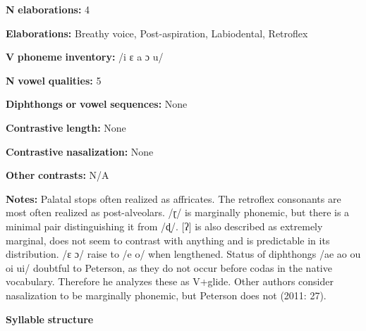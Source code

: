 \begin{styleBody}
\textbf{N} \textbf{elaborations:} 4
\end{styleBody}

\begin{styleBody}
\textbf{Elaborations:} Breathy voice, Post-aspiration, Labiodental, Retroflex
\end{styleBody}

\begin{styleBody}
\textbf{V} \textbf{phoneme} \textbf{inventory:} /i ɛ a ɔ u/
\end{styleBody}

\begin{styleBody}
\textbf{N} \textbf{vowel} \textbf{qualities:} 5
\end{styleBody}

\begin{styleBody}
\textbf{Diphthongs} \textbf{or} \textbf{vowel} \textbf{sequences:} None
\end{styleBody}

\begin{styleBody}
\textbf{Contrastive} \textbf{length:} None
\end{styleBody}

\begin{styleBody}
\textbf{Contrastive} \textbf{nasalization:} None
\end{styleBody}

\begin{styleBody}
\textbf{Other} \textbf{contrasts:} N/A
\end{styleBody}

\begin{styleBody}
\textbf{Notes:} Palatal stops often realized as affricates. The retroflex consonants are most often realized as post-alveolars. /ɽ/ is marginally phonemic, but there is a minimal pair distinguishing it from /ɖ/. [ʔ] is also described as extremely marginal, does not seem to contrast with anything and is predictable in its distribution. /ɛ ɔ/ raise to /e o/ when lengthened. Status of diphthongs /ae ao ou oi ui/ doubtful to Peterson, as they do not occur before codas in the native vocabulary. Therefore he analyzes these as V+glide. Other authors consider nasalization to be marginally phonemic, but Peterson does not (2011: 27).
\end{styleBody}

\begin{styleBody}
\textbf{Syllable} \textbf{structure}
\end{styleBody}


